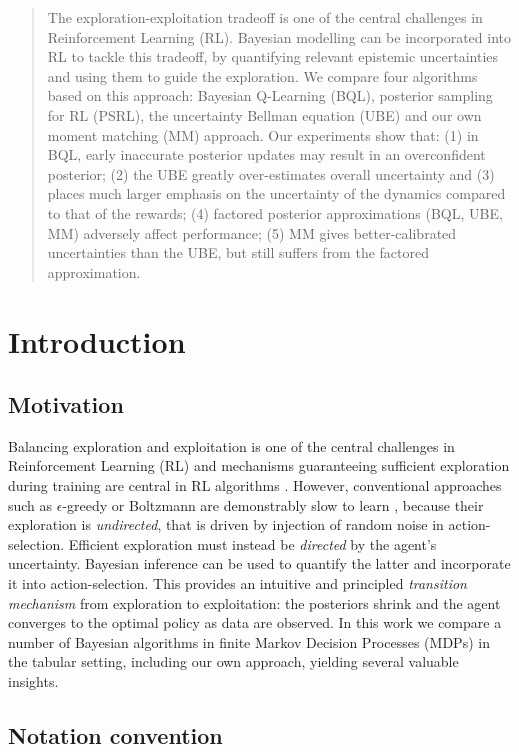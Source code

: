 \documentclass{article}
\begin{document}
\begin{abstract}
The exploration-exploitation tradeoff is one of the central challenges in Reinforcement Learning (RL). Bayesian modelling can be incorporated into RL to tackle this tradeoff, by quantifying relevant epistemic uncertainties and using them to guide the exploration. We compare four algorithms based on this approach: Bayesian Q-Learning (BQL), posterior sampling for RL (PSRL), the uncertainty Bellman equation (UBE) and our own moment matching (MM) approach. Our experiments show that: (1) in BQL, early inaccurate posterior updates may result in an overconfident posterior; (2) the UBE greatly over-estimates overall uncertainty and (3) places much larger emphasis on the uncertainty of the dynamics compared to that of the rewards; (4) factored posterior approximations (BQL, UBE, MM) adversely affect performance; (5) MM gives better-calibrated uncertainties than the UBE, but still suffers from the factored approximation.
\end{abstract}

\section{Introduction}

\subsection{Motivation}
Balancing exploration and exploitation is one of the central challenges in Reinforcement Learning (RL) and mechanisms guaranteeing sufficient exploration during training are central in RL algorithms \citep{suttonbarto}. However, conventional approaches such as $\epsilon$-greedy or Boltzmann are demonstrably slow to learn \citep{iothesis}, because their exploration is \textit{undirected}, that is driven by injection of random noise in action-selection. Efficient exploration must instead be \textit{directed} by the agent's uncertainty. Bayesian inference can be used to quantify the latter and incorporate it into action-selection. This provides an intuitive and principled \textit{transition mechanism} from exploration to exploitation: the posteriors shrink and the agent converges to the optimal policy as data are observed. In this work we compare a number of Bayesian algorithms in finite Markov Decision Processes (MDPs) in the tabular setting, including our own approach, yielding several valuable insights.

\subsection{Notation convention}
\end{document}
